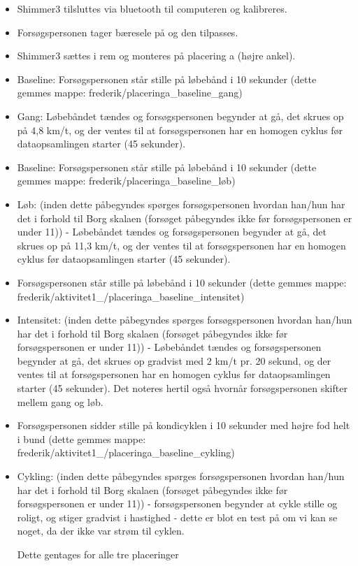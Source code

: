 \begin{itemize}
	\item Shimmer3 tilsluttes via bluetooth til computeren og kalibreres.
	\item Forsøgspersonen tager bæresele på og den tilpasses.
	\item Shimmer3 sættes i rem og monteres på placering a (højre ankel).
	\item Baseline: Forsøgspersonen står stille på løbebånd i 10 sekunder (dette gemmes mappe: frederik/placeringa_baseline_gang) 
	\item Gang: Løbebåndet tændes og forsøgspersonen begynder at gå, det skrues op på 4,8 km/t, og der ventes til at forsøgspersonen har en homogen cyklus før dataopsamlingen starter (45 sekunder).
	\item Baseline: Forsøgspersonen står stille på løbebånd i 10 sekunder (dette gemmes mappe: frederik/placeringa_baseline_løb)
	\item Løb: (inden dette påbegyndes spørges forsøgspersonen hvordan han/hun har det i forhold til Borg skalaen (forsøget påbegyndes ikke før forsøgspersonen er under 11)) - Løbebåndet tændes og forsøgspersonen begynder at gå, det skrues op på 11,3 km/t, og der ventes til at forsøgspersonen har en homogen cyklus før dataopsamlingen starter (45 sekunder).
	\item Forsøgspersonen står stille på løbebånd i 10 sekunder (dette gemmes mappe: frederik/aktivitet1_/placeringa_baseline_intensitet)
	\item Intensitet: (inden dette påbegyndes spørges forsøgspersonen hvordan han/hun har det i forhold til Borg skalaen (forsøget påbegyndes ikke før forsøgspersonen er under 11)) - Løbebåndet tændes og forsøgspersonen begynder at gå, det skrues op gradvist med 2 km/t pr. 20 sekund, og der ventes til at forsøgspersonen har en homogen cyklus før dataopsamlingen starter (45 sekunder).
	\subitem Det noteres hertil også hvornår forsøgspersonen skifter mellem gang og løb.
	\item Forsøgspersonen sidder stille på kondicyklen i 10 sekunder med højre fod helt i bund (dette gemmes mappe: frederik/aktivitet1_/placeringa_baseline_cykling)
	\item Cykling: (inden dette påbegyndes spørges forsøgspersonen hvordan han/hun har det i forhold til Borg skalaen (forsøget påbegyndes ikke før forsøgspersonen er under 11)) - forsøgspersonen begynder at cykle stille og roligt, og stiger gradvist i hastighed - dette er blot en test på om vi kan se noget, da der ikke var strøm til cyklen.
	
	Dette gentages for alle tre placeringer
\end{itemize}

